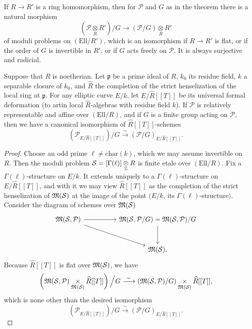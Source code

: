 \begin{krem}\label{rem:7.1.4}
If $R \to R'$ is a ring homomorphism, then for $\mathcal{P}$ and $G$ as in the theorem there is a natural morphism
\[
(\mathcal{P} \underset{R}{\otimes} R')/G \to (\mathcal{P}/G) \underset{R}{\otimes} R'
\]
of moduli problems on $(\mathrm{Ell}/R')$, which is an isomorphism if $R \to R'$ is flat, or if the order of $G$ is invertible in $R'$, or if $G$ acts freely on $\mathcal{P}$. It is always surjective and radicial.
\end{krem}

\begin{kcor}\label{cor:7.1.5}
Suppose that $R$ is noetherian. Let $\mathfrak{p}$ be a prime ideal of $R$, $k_0$ its residue field, $k$ a separable closure of $k_0$, and $\widehat{R}$ the completion of the strict henselization of the local ring at $\mathfrak{p}$. For any elliptic curve $E/k$, let $E/\widehat{R}[[T]]$ be its universal formal deformation (to artin local $\widehat{R}$-algebras with residue field $k$). If $\mathcal{P}$ is relatively representable and affine over $(\mathrm{Ell}/R)$, and if $G$ is a finite group acting on $\mathcal{P}$, then we have a canonical isomorphism of $\widehat{R}[[T]]$-schemes
\[
(\mathcal{P}_{E/\widehat{R}[[T]]})/G \xrightarrow{\ \sim\ } (\mathcal{P}/G)_{E/\widehat{R}[[T]]} .
\]
\end{kcor}

\begin{proof}
Choose an odd prime $\ell \neq \mathrm{char}(k)$, which we may assume invertible on $R$. Then the moduli problem $\mathcal{S} = [\Gamma(\ell)] \underset{\mathbb{Z}}{\otimes} R$ is finite etale over $(\mathrm{Ell}/R)$. Fix a $\Gamma(\ell)$-structure on $E/k$. It extends uniquely to a $\Gamma(\ell)$-structure on $E/\widehat{R}[[T]]$, and with it we may view $\widehat{R}[[T]]$ as the completion of the strict henselization of $\mathfrak{M}(\mathcal{S})$ at the image of the point $(E/k$, its $\Gamma(\ell)$-structure$)$. Consider the diagram of schemes over $\mathfrak{M}(\mathcal{S})$
\[
\begin{tikzcd}[column sep=huge, row sep=large]
\Mfrak(\mathcal{S}, \mathcal{P}) \arrow[r] \arrow[rd] & \Mfrak(\mathcal{S}, \mathcal{P}/G) = \Mfrak(\mathcal{S}, \mathcal{P})/G \arrow[d] \\
& \Mfrak(\mathcal{S}) ,
\end{tikzcd}
\]
Because $\widehat{R}[[T]]$ is flat over $\mathfrak{M}(\mathcal{S})$, we have
\[
\left( \mathfrak{M}(\mathcal{S}, \mathcal{P}) \underset{\mathfrak{M}(\mathcal{S})}{\times} \widehat{R}[[T]] \right) \Big/ G \xrightarrow{\ \sim\ } \left( \mathfrak{M}(\mathcal{S}, \mathcal{P})/G \right) \underset{\mathfrak{M}(\mathcal{S})}{\times} \widehat{R}[[T]] ,
\]
which is none other than the desired isomorphism
\[
(\mathcal{P}_{E/\widehat{R}[[T]]})/G \xrightarrow{\ \sim\ } (\mathcal{P}/G)_{E/\widehat{R}[[T]]} .
\]
\end{proof}


